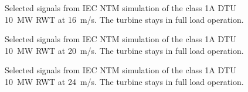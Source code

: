 \begin{figure}[t]
\centerline{ }
\caption{Selected signals from IEC NTM simulation of the class 1A DTU 10~MW RWT at 16~m/s. The turbine stays in full load operation. \label{f:16ms}}
\end{figure}


\begin{figure}[t]
\centerline{ }
\caption{Selected signals from IEC NTM simulation of the class 1A DTU 10~MW RWT at 20~m/s. The turbine stays in full load operation. \label{f:20ms}}
\end{figure}


\begin{figure}[t]
\centerline{ }
\caption{Selected signals from IEC NTM simulation of the class 1A DTU 10~MW RWT at 24~m/s. The turbine stays in full load operation. \label{f:24ms}}
\end{figure}
